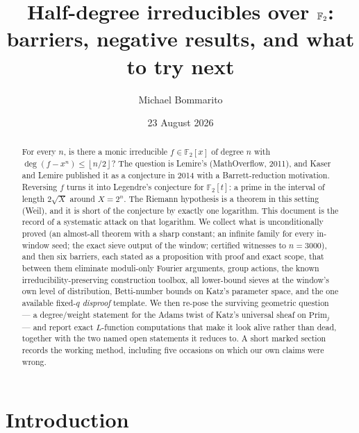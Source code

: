 \documentclass[10pt]{article}
\title{\vspace{-2.2em}Half-degree irreducibles over $\F_2$:\\
barriers, negative results, and what to try next}
\author{Michael Bommarito}
\date{23 August 2026}
\theoremstyle{plain}
\theoremstyle{definition}
\newcommand{\F}{\mathbb F}
\newcommand{\flr}[1]{\left\lfloor #1\right\rfloor}
\newcommand{\Prim}{\mathrm{Prim}}
\begin{document}
\maketitle
\vspace{-1.2em}

\begin{center}
\end{center}

\begin{abstract}
For every $n$, is there a monic irreducible $f\in\F_2[x]$ of degree $n$ with
$\deg(f-x^n)\le\flr{n/2}$? The question is Lemire's (MathOverflow, 2011), and
Kaser and Lemire published it as a conjecture in 2014 with a
Barrett-reduction motivation. Reversing $f$ turns it into Legendre's conjecture
for $\F_2[t]$: a prime in the interval of length $2\sqrt X$ around $X=2^n$.
The Riemann hypothesis is a theorem in this setting (Weil), and it is
short of the conjecture by exactly one logarithm. This document is the
record of a systematic attack on that logarithm. We collect what is
unconditionally proved (an almost-all theorem with a sharp constant; an
infinite family for every in-window seed; the exact sieve output of the
window; certified witnesses to $n=3000$), and then six barriers, each
stated as a proposition with proof and exact scope, that between them
eliminate moduli-only Fourier arguments, group actions, the known
irreducibility-preserving construction toolbox, all lower-bound sieves at
the window's own level of distribution, Betti-number bounds on Katz's
parameter space, and the one available fixed-$q$ \emph{disproof} template.
We then re-pose the surviving geometric question --- a
degree/weight statement for the Adams twist of Katz's universal sheaf on
$\Prim_j$ --- and report exact $L$-function computations that make it
look alive rather than dead, together with the two named open statements
it reduces to. A short marked section records the working method,
including five occasions on which our own claims were wrong.
\end{abstract}

\tableofcontents

\section{Introduction}
\end{document}
